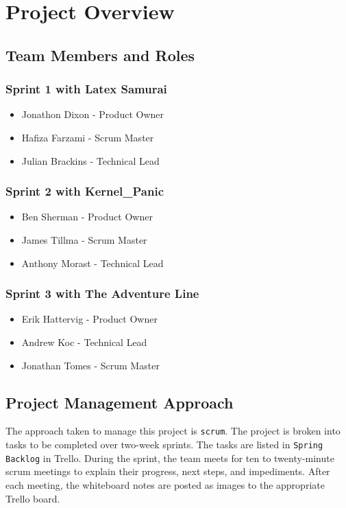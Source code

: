 

\chapter{Project Overview}



\section{Team Members and Roles}
\subsection{Sprint 1 with Latex Samurai}
\begin{itemize}
	\item Jonathon Dixon - Product Owner
	\item Hafiza Farzami - Scrum Master
	\item Julian Brackins - Technical Lead
\end{itemize}
\subsection{Sprint 2 with Kernel\_Panic}
\begin{itemize}
  \item Ben Sherman - Product Owner
  \item James Tillma - Scrum Master
  \item Anthony Morast - Technical Lead  
\end{itemize}
\subsection{Sprint 3 with The Adventure Line}
\begin{itemize}
	\item Erik Hattervig - Product Owner
	\item Andrew Koc - Technical Lead
	\item Jonathan Tomes - Scrum Master
\end{itemize}


\section{Project  Management Approach}
The approach taken to manage this project is {\tt scrum}. The project is broken into tasks to be completed over two-week sprints. The tasks are listed in {\tt Spring Backlog} in Trello. During the sprint, the team meets for ten to twenty-minute scrum meetings to explain their progress, next steps, and impediments. After each meeting, the whiteboard notes are posted as images to the appropriate Trello board.


